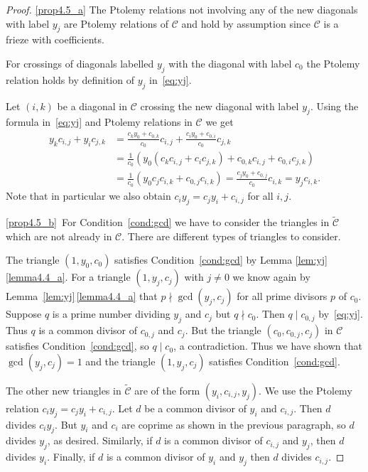 \documentclass[ALCO,ThmDefs,Unicode,epreuves,published]{cedram}
\numberwithin{equation}{section}
\begin{document}
\begin{proof}
\ref{prop4.5_a} The Ptolemy relations not involving any of the new diagonals with
label $y_j$ are Ptolemy relations of $\mathcal{C}$ and hold by assumption 
since $\mathcal{C}$ is a frieze with coefficients. 

For crossings of diagonals labelled $y_j$ with the diagonal with label $c_0$
the Ptolemy relation holds by definition of $y_j$ in~\eqref{eq:yj}. 

Let $(i,k)$ be a diagonal in $\mathcal{C}$ crossing the new diagonal with label 
$y_j$. Using the formula in~\eqref{eq:yj} and Ptolemy relations in $\mathcal{C}$
we get
\begin{align*}
y_kc_{i,j} + y_i c_{j,k} & =  \frac{c_ky_0+c_{0,k}}{c_0} c_{i,j}
+ \frac{c_iy_0+c_{0,i}}{c_0} c_{j,k} \\
& =  \frac{1}{c_0} ( y_0 (c_kc_{i,j} + c_ic_{j,k}) + 
c_{0,k} c_{i,j} + c_{0,i} c_{j,k}) \\
& =  \frac{1}{c_0} ( y_0 c_jc_{i,k} + c_{0,j}c_{i,k}) 
 = \frac{c_j y_0+c_{0,j}}{c_0} c_{i,k} = y_j c_{i,k}. 
\end{align*}
Note that in particular we also obtain $c_i y_j = c_j y_i + c_{i,j}$ for all $i,j$.

\ref{prop4.5_b}~For Condition~\eqref{cond:gcd} we have to consider the triangles in
$\widetilde{\mathcal{C}}$ which are not already in $\mathcal{C}$. 
There are different types of triangles to consider. 

The triangle $(1,y_0,c_0)$ satisfies Condition~\eqref{cond:gcd} by Lemma 
\ref{lem:yj}\,\ref{lemma4.4_a}. For a triangle $(1,y_j,c_j)$ with $j\neq 0$ we know again
by Lemma~\ref{lem:yj}\,\ref{lemma4.4_a} that $p\nmid \gcd(y_j,c_j)$ for all prime divisors
$p$ of $c_0$. Suppose $q$ is a prime number dividing $y_j$ and $c_j$ but
$q\nmid c_0$. Then $q\mid c_{0,j}$ by~\eqref{eq:yj}. Thus $q$ is a common divisor
of $c_{0,j}$ and $c_j$. But the triangle $(c_0,c_{0,j},c_j)$ in $\mathcal{C}$
satisfies Condition~\eqref{cond:gcd}, so $q\mid c_0$, a contradiction. Thus 
we have shown that $\gcd(y_j,c_j)=1$ and the triangle $(1,y_j,c_j)$ satisfies
Condition~\eqref{cond:gcd}.

The other new triangles in $\widetilde{\mathcal{C}}$ are of the form
$(y_i,c_{i,j},y_j)$. We use the Ptolemy relation $c_i y_j = c_j y_i + c_{i,j}$.
Let $d$ be a common divisor of $y_i$ and $c_{i,j}$. Then $d$ divides $c_iy_j$.
But $y_i$ and $c_i$ are coprime as shown in the previous paragraph, so $d$ divides $y_j$, as desired. Similarly, if $d$ is a common divisor of $c_{i,j}$ and $y_j$, then $d$ divides $y_i$. Finally, if $d$ is a common divisor 
of $y_i$ and $y_j$ then $d$ divides $c_{i,j}$. 


\end{proof}
\end{document}
